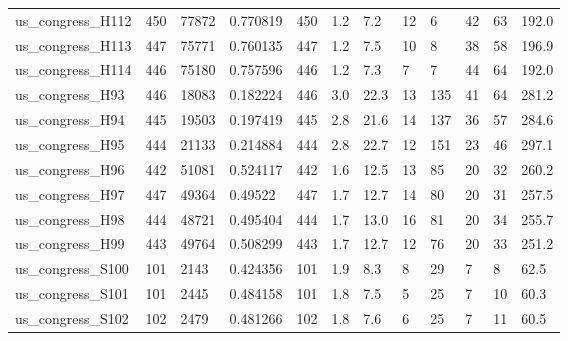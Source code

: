 \begin{longtable}{llllllllllll}
 us\_congress\_H112                                   & 450        & 77872     & 0.770819    & 450   & 1.2    & 7.2    & 12    & 6      & 42     & 63     & 192.0   \\
 us\_congress\_H113                                   & 447        & 75771     & 0.760135    & 447   & 1.2    & 7.5    & 10    & 8      & 38     & 58     & 196.9   \\
 us\_congress\_H114                                   & 446        & 75180     & 0.757596    & 446   & 1.2    & 7.3    & 7     & 7      & 44     & 64     & 192.0   \\
 us\_congress\_H93                                    & 446        & 18083     & 0.182224    & 446   & 3.0    & 22.3   & 13    & 135    & 41     & 64     & 281.2   \\
 us\_congress\_H94                                    & 445        & 19503     & 0.197419    & 445   & 2.8    & 21.6   & 14    & 137    & 36     & 57     & 284.6   \\
 us\_congress\_H95                                    & 444        & 21133     & 0.214884    & 444   & 2.8    & 22.7   & 12    & 151    & 23     & 46     & 297.1   \\
 us\_congress\_H96                                    & 442        & 51081     & 0.524117    & 442   & 1.6    & 12.5   & 13    & 85     & 20     & 32     & 260.2   \\
 us\_congress\_H97                                    & 447        & 49364     & 0.49522     & 447   & 1.7    & 12.7   & 14    & 80     & 20     & 31     & 257.5   \\
 us\_congress\_H98                                    & 444        & 48721     & 0.495404    & 444   & 1.7    & 13.0   & 16    & 81     & 20     & 34     & 255.7   \\
 us\_congress\_H99                                    & 443        & 49764     & 0.508299    & 443   & 1.7    & 12.7   & 12    & 76     & 20     & 33     & 251.2   \\
 us\_congress\_S100                                   & 101        & 2143      & 0.424356    & 101   & 1.9    & 8.3    & 8     & 29     & 7      & 8      & 62.5    \\
 us\_congress\_S101                                   & 101        & 2445      & 0.484158    & 101   & 1.8    & 7.5    & 5     & 25     & 7      & 10     & 60.3    \\
 us\_congress\_S102                                   & 102        & 2479      & 0.481266    & 102   & 1.8    & 7.6    & 6     & 25     & 7      & 11     & 60.5    \\

\end{longtable}
